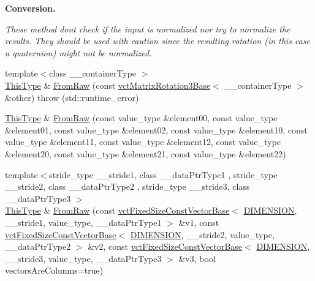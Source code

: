 \begin{Indent}{\bf Conversion.}\par
{\em These method don\textquotesingle{}t check if the input is normalized nor try to normalize the results. They should be used with caution since the resulting rotation (in this case a quaternion) might not be normalized. }\begin{DoxyCompactItemize}
\item 
{\footnotesize template$<$class \+\_\+\+\_\+container\+Type $>$ }\\\hyperlink{classvct_matrix_rotation3_base_a027be766cb10ca3c2ad8e85c28ed0af9}{This\+Type} \& \hyperlink{classvct_matrix_rotation3_base_a0948db2e0ad2ee1f27a2fdc3c3a7b8e1}{From\+Raw} (const \hyperlink{classvct_matrix_rotation3_base}{vct\+Matrix\+Rotation3\+Base}$<$ \+\_\+\+\_\+container\+Type $>$ \&other)  throw (std\+::runtime\+\_\+error)
\item 
\hyperlink{classvct_matrix_rotation3_base_a027be766cb10ca3c2ad8e85c28ed0af9}{This\+Type} \& \hyperlink{classvct_matrix_rotation3_base_a016b4c79b3e13e79c1e1608a0a921117}{From\+Raw} (const value\+\_\+type \&element00, const value\+\_\+type \&element01, const value\+\_\+type \&element02, const value\+\_\+type \&element10, const value\+\_\+type \&element11, const value\+\_\+type \&element12, const value\+\_\+type \&element20, const value\+\_\+type \&element21, const value\+\_\+type \&element22)
\item 
{\footnotesize template$<$stride\+\_\+type \+\_\+\+\_\+stride1, class \+\_\+\+\_\+data\+Ptr\+Type1 , stride\+\_\+type \+\_\+\+\_\+stride2, class \+\_\+\+\_\+data\+Ptr\+Type2 , stride\+\_\+type \+\_\+\+\_\+stride3, class \+\_\+\+\_\+data\+Ptr\+Type3 $>$ }\\\hyperlink{classvct_matrix_rotation3_base_a027be766cb10ca3c2ad8e85c28ed0af9}{This\+Type} \& \hyperlink{classvct_matrix_rotation3_base_ac62edf48bdbb7fe36c2b2c54d0a5001b}{From\+Raw} (const \hyperlink{classvct_fixed_size_const_vector_base}{vct\+Fixed\+Size\+Const\+Vector\+Base}$<$ \hyperlink{classvct_matrix_rotation3_base_a97514c086bdd3a691714817775b02f21a43f9b5ba9769ee62eadd8398853504cd}{D\+I\+M\+E\+N\+S\+I\+O\+N}, \+\_\+\+\_\+stride1, value\+\_\+type, \+\_\+\+\_\+data\+Ptr\+Type1 $>$ \&v1, const \hyperlink{classvct_fixed_size_const_vector_base}{vct\+Fixed\+Size\+Const\+Vector\+Base}$<$ \hyperlink{classvct_matrix_rotation3_base_a97514c086bdd3a691714817775b02f21a43f9b5ba9769ee62eadd8398853504cd}{D\+I\+M\+E\+N\+S\+I\+O\+N}, \+\_\+\+\_\+stride2, value\+\_\+type, \+\_\+\+\_\+data\+Ptr\+Type2 $>$ \&v2, const \hyperlink{classvct_fixed_size_const_vector_base}{vct\+Fixed\+Size\+Const\+Vector\+Base}$<$ \hyperlink{classvct_matrix_rotation3_base_a97514c086bdd3a691714817775b02f21a43f9b5ba9769ee62eadd8398853504cd}{D\+I\+M\+E\+N\+S\+I\+O\+N}, \+\_\+\+\_\+stride3, value\+\_\+type, \+\_\+\+\_\+data\+Ptr\+Type3 $>$ \&v3, bool vectors\+Are\+Columns=true)

\end{DoxyCompactItemize}
\end{Indent}
